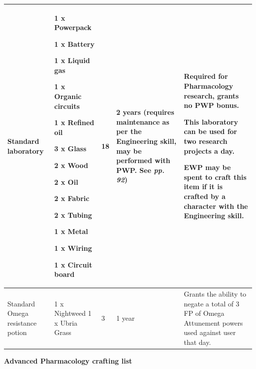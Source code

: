 \begin{table}
\begin{tabular}{|l|l|l|l|l|} \hline 
Standard laboratory & 1 x Powerpack\par 1 x Battery\par 1 x Liquid gas\par 1 x Organic circuits\par 1 x Refined oil\par 3 x Glass\par 2 x Wood\par 2 x Oil\par 2 x Fabric\par 2 x Tubing\par 1 x Metal\par 1 x Wiring\par 1 x Circuit board & 18 & 2 years (requires maintenance as per the Engineering skill, may be performed with PWP. See \textit{pp. 92}) & Required for Pharmacology research, grants no PWP bonus.\par This laboratory can be used for two research projects a day.\par \textbf{EWP} may be spent to craft this item if it is crafted by a character with the Engineering skill. \\
 \hline Standard Omega resistance potion & 1 x Nightweed 1 x Ubria Grass & 3 & 1 year & Grants the ability to negate a total of 3 FP of Omega Attunement powers used against user that day. \\
 \hline \end{tabular}

\end{table}

\textbf{Advanced Pharmacology crafting list}


